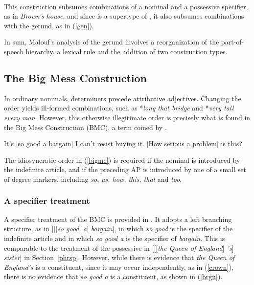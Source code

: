 \documentclass[output=paper
	        ,collection
	        ,collectionchapter
 	        ,biblatex
                ,babelshorthands
                ,newtxmath
                ,draftmode
                ,colorlinks, citecolor=brown
]{langscibook}
\begin{document}
\begin{exe} 
\ex\label{gencx} 
 ~ \impl ~ 
\end{exe}
 
\noindent
This construction subsumes combinations of a nominal and a 
possessive specifier, as in \emph{Brown's house}, and since 
 is a supertype of ,  
it also subsumes combinations with the gerund, as in (\ref{gen}). 

In sum, Malouf's analysis of the gerund involves a reorganization of the 
part-of-speech hierarchy, a lexical rule and the addition of two construction types.     



\subsection{The Big Mess Construction} 
\label{bime}  


In ordinary nominals, determiners precede attributive adjectives. Changing the order 
yields ill-formed combinations, such as *\emph{long that bridge} and *\emph{very tall every man}. 
However, this otherwise illegitimate order is precisely what is found in 
the Big Mess Construction (BMC), a term coined by \citet{Berman74}.  

\begin{exe}
\ex\label{bigme}
\begin{xlist}
\ex   It's [so good a bargain] I can't resist buying it.
\ex   {}[How serious a problem] is this?
\end{xlist}
\end{exe} 

\noindent
The idiosyncratic order in (\ref{bigme}) is required if the nominal is introduced 
by the indefinite article, and if the preceding AP is introduced by one of a small 
set of degree markers, including \emph{so, as, how, this, that} and \emph{too}. 


\subsubsection{A specifier treatment} 


A specifier treatment of the BMC is provided in \citet[201]{GS00}. It adopts  
a left branching structure, as in [[[\emph{so good}] \emph{a}] \emph{bargain}], 
in which \emph{so good} is the specifier of the indefinite article and in which 
\emph{so good a} is the specifier of \emph{bargain}. 
This is comparable to the treatment of the possessive in 
[[[\emph{the Queen of England}] \emph{'s}] \emph{sister}] in Section~\ref{phrsp}.  
However, while there is evidence that \emph{the Queen of England's} is a constituent,
since it may occur independently, as in (\ref{crown}), there is no evidence that 
\emph{so good a} is a constituent, as shown in (\ref{brgn}).
\end{document}
